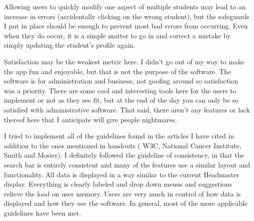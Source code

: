 \documentclass{article}
\begin{document}
Allowing users to quickly modify one aspect of multiple students may lead to an increase in errors (accidentally clicking on the wrong student), but the safeguards I put in place should be enough to prevent most bad errors from occurring. Even when they do occur, it is a simple matter to go in and correct a mistake by simply updating the student's profile again. 

Satisfaction may be the weakest  metric here. I didn't go out of my way to make the app fun and enjoyable, but that is not the purpose of the software. The software is for administration and business, not goofing around so satisfaction was a priority. There are some cool and interesting tools here for the users to implement or not as they see fit, but at the end of the day you can only be so satisfied with administrative software. That said, there aren't any features or lack thereof here that I anticipate will give people nightmares.

I tried to implement all of the guidelines found in the articles I have cited in addition to the ones mentioned in handouts ( W3C, National Cancer Institute, Smith and Mosier). I definitely followed the guideline of consistency, in that the search bar is entirely consistent and many of the features use a similar layout and functionality. All data is displayed in a way similar to the current Headmaster display. Everything is clearly labeled and drop down menus and suggestions relieve the load on user memory. Users are very much in control of how data is displayed and how they use the software. In general, most of the more applicable guidelines have been met.



\end{document}

